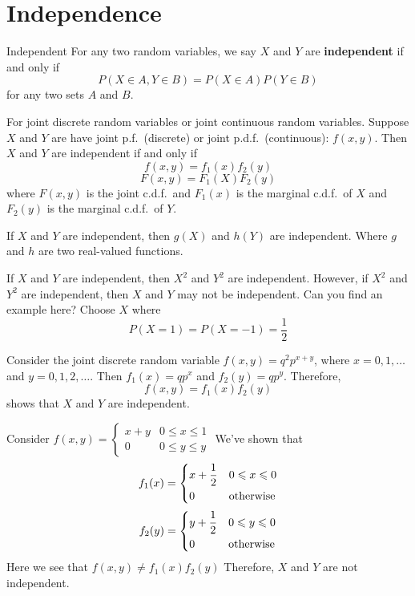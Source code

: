 \section{Independence}
\begin{Definition}{Independent}{}
    For any two random variables, we say $ X $ and $ Y $
    are \textbf{independent} if and only if
    \[ P(X\in A,Y\in B)=P(X\in A)P(Y\in B) \]
    for any two sets $ A $ and $ B $.
\end{Definition}

\begin{Theorem}{}{}
    For joint discrete random variables or joint continuous random variables.
    Suppose $ X $ and $ Y $ are have joint p.f.\ (discrete)
    or joint p.d.f.\ (continuous): $ f(x,y) $. Then
    $ X $ and $ Y $ are independent if and only if
    \[ f(x,y)=f_1(x)f_2(y) \]
    \[ F(x,y)=F_1(X)F_2(y) \]
    where $ F(x,y) $ is the joint c.d.f.\
    and $ F_1(x) $ is the marginal c.d.f.\ of $ X $
    and $ F_2(y) $ is the marginal c.d.f.\ of $ Y $.
\end{Theorem}

\begin{Theorem}{}{}
    If $ X $ and $ Y $ are independent,
    then $ g(X) $ and $ h(Y) $ are independent.
    Where $ g $ and $ h $ are two real-valued functions.
\end{Theorem}

\begin{Example}{}{}
    If $ X $ and $ Y $ are independent,
    then $ X^2 $ and $ Y^2 $ are independent. However,
    if $ X^2 $ and $ Y^2 $ are independent, then $ X $
    and $ Y $ may not be independent. Can you find an example here?
    Choose $ X $ where
    \[ P(X=1)=P(X=-1)=\frac{1}{2} \]
\end{Example}

\begin{Example}{}{}
    Consider the joint discrete random variable
    $ f(x,y)=q^2 p^{x+y} $, where $ x=0,1,\ldots $
    and $ y=0,1,2,\ldots $. Then $ f_1(x)=qp^x $
    and $ f_2(y)=qp^y $. Therefore,
    \[ f(x,y)=f_1(x)f_2(y) \]
    shows that $ X $ and $ Y $ are independent.

    Consider $ \displaystyle
        f(x,y)=\begin{cases}
            x+y & 0\leqslant x\leqslant 1 \\
            0   & 0\leqslant y\leqslant y
        \end{cases} $
    We've shown that
    \[ f_1(x)=\begin{dcases}
            x+\frac{1}{2} & 0\leqslant x\leqslant 0 \\
            0             & \text{otherwise}
        \end{dcases} \]
    \[ f_2(y)=\begin{dcases}
            y+\frac{1}{2} & 0\leqslant y\leqslant 0 \\
            0             & \text{otherwise}
        \end{dcases} \]
    Here we see that $ f(x,y)\neq f_1(x)f_2(y) $
    Therefore, $ X $ and $ Y $ are not independent.
\end{Example}

